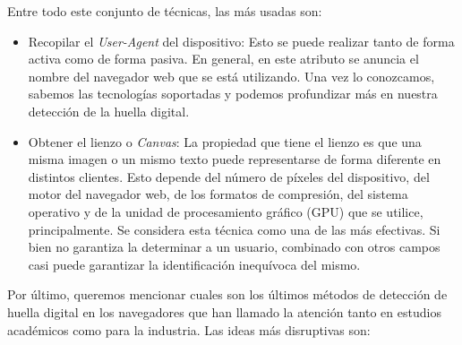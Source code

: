Entre todo este conjunto de técnicas, las más usadas son: \par 

\begin{itemize}
	\item Recopilar el \textit{User-Agent} del dispositivo: Esto se puede realizar tanto de forma activa como de forma pasiva. En general, en este atributo se anuncia el nombre del navegador web que se está utilizando. Una vez lo conozcamos, sabemos las tecnologías soportadas y podemos profundizar más en nuestra detección de la huella digital.
	
	\item Obtener el lienzo o \textit{Canvas}: La propiedad que tiene el lienzo es que una misma imagen o un mismo texto puede representarse de forma diferente en distintos clientes. Esto depende del número de píxeles del dispositivo, del motor del navegador web, de los formatos de compresión, del sistema operativo y de la unidad de procesamiento gráfico (GPU) que se utilice, principalmente. Se considera esta técnica como una de las más efectivas\cite{never_forget_paper}. Si bien no garantiza la determinar a un usuario, combinado con otros campos casi puede garantizar la identificación inequívoca del mismo.
	
\end{itemize}

Por último, queremos mencionar cuales son los últimos métodos de detección de huella digital en los navegadores que han llamado la atención tanto en estudios académicos como para la industria. Las ideas más disruptivas son: \par


